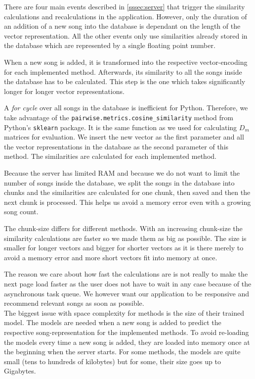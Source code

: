 There are four main events described in \ref{sssec:server} that trigger the similarity calculations and recalculations in the application. However, only the duration of an addition of a new song into the database is dependant on the length of the vector representation. All the other events only use similarities already stored in the database which are represented by a single floating point number.

When a new song is added, it is transformed into the respective vector-encoding for each implemented method. Afterwards, its similarity to all the songs inside the database has to be calculated. This step is the one which takes significantly longer for longer vector representations. 

A \textit{for cycle} over all songs in the database is inefficient for Python. Therefore, we take advantage of the \texttt{pairwise.metrics.cosine\_similarity} method from Python's \texttt{sklearn} package. It is the same function as we used for calculating $D_m$ matrices for evaluation. 
We insert the new vector as the first parameter and all the vector representations in the database as the second parameter of this method. The similarities are calculated for each implemented method. 

Because the server has limited RAM and because we do not want to limit the number of songs inside the database, we split the songs in the database into chunks and the similarities are calculated for one chunk, then saved and then the next chunk is processed. This helps us avoid a memory error even with a growing song count.

The chunk-size differs for different methods. With an increasing chunk-size the similarity calculations are faster so we made them as big as possible. The size is smaller for longer vectors and bigger for shorter vectors as it is there merely to avoid a memory error and more short vectors fit into memory at once. 

The reason we care about how fast the calculations are is not really to make the next page load faster as the user does not have to wait in any case because of the asynchronous task queue. We however want our application to be responsive and recommend relevant songs as soon as possible. \\

The biggest issue with space complexity for methods is the size of their trained model. The models are needed when a new song is added to predict the respective song-representation for the implemented methods. To avoid re-loading the models every time a new song is added, they are loaded into memory once at the beginning when the server starts. For some methods, the models are quite small (tens to hundreds of kilobytes) but for some, their size goes up to Gigabytes.

